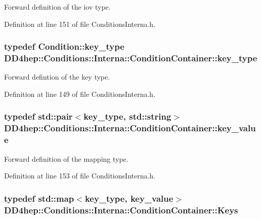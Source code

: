 Forward definition of the iov type. 

Definition at line 151 of file ConditionsInterna.h.\hypertarget{class_d_d4hep_1_1_conditions_1_1_interna_1_1_condition_container_a7a4545b4b0536565feb7346bd97c63fa}{
\subsubsection[{key\_\-type}]{\setlength{\rightskip}{0pt plus 5cm}typedef {\bf Condition::key\_\-type} {\bf DD4hep::Conditions::Interna::ConditionContainer::key\_\-type}}}
\label{class_d_d4hep_1_1_conditions_1_1_interna_1_1_condition_container_a7a4545b4b0536565feb7346bd97c63fa}


Forward defintion of the key type. 

Definition at line 149 of file ConditionsInterna.h.\hypertarget{class_d_d4hep_1_1_conditions_1_1_interna_1_1_condition_container_a2a8452e68d48eb94553607e7d7ae13f6}{
\subsubsection[{key\_\-value}]{\setlength{\rightskip}{0pt plus 5cm}typedef std::pair$<${\bf key\_\-type}, std::string$>$ {\bf DD4hep::Conditions::Interna::ConditionContainer::key\_\-value}}}
\label{class_d_d4hep_1_1_conditions_1_1_interna_1_1_condition_container_a2a8452e68d48eb94553607e7d7ae13f6}


Forward definition of the mapping type. 

Definition at line 153 of file ConditionsInterna.h.\hypertarget{class_d_d4hep_1_1_conditions_1_1_interna_1_1_condition_container_a01f9461850ee260a6c76646f9619c8bb}{
\subsubsection[{Keys}]{\setlength{\rightskip}{0pt plus 5cm}typedef std::map$<${\bf key\_\-type}, {\bf key\_\-value}$>$ {\bf DD4hep::Conditions::Interna::ConditionContainer::Keys}}}
\label{class_d_d4hep_1_1_conditions_1_1_interna_1_1_condition_container_a01f9461850ee260a6c76646f9619c8bb}


